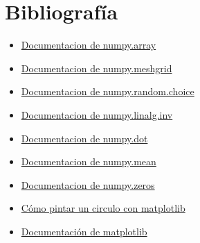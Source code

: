 \chapter{Bibliografía}
\begin{itemize}

   \item \href{https://docs.scipy.org/doc/numpy/reference/generated/numpy.array.html}{Documentacion de numpy.array}
   \item \href{https://docs.scipy.org/doc/numpy/reference/generated/numpy.meshgrid.html}{Documentacion de numpy.meshgrid}
   \item \href{https://docs.scipy.org/doc/numpy-1.13.0/reference/generated/numpy.random.choice.html}{Documentacion de numpy.random.choice}
   \item \href{https://docs.scipy.org/doc/numpy/reference/generated/numpy.linalg.inv.html}{Documentacion de numpy.linalg.inv}
   \item \href{https://docs.scipy.org/doc/numpy/reference/generated/numpy.dot.html}{Documentacion de numpy.dot}
   \item \href{https://het.as.utexas.edu/HET/Software/Numpy/reference/generated/numpy.mean.html#numpy.mean}{Documentacion de numpy.mean}
   \item \href{https://docs.scipy.org/doc/numpy/reference/generated/numpy.zeros.html#numpy.zeros}{Documentacion de numpy.zeros}
   \item \href{https://stackoverflow.com/questions/32092899/plot-equation-showing-a-circle}{Cómo pintar un circulo con matplotlib}
   \item \href{https://matplotlib.org/}{Documentación de matplotlib}

\end{itemize}

